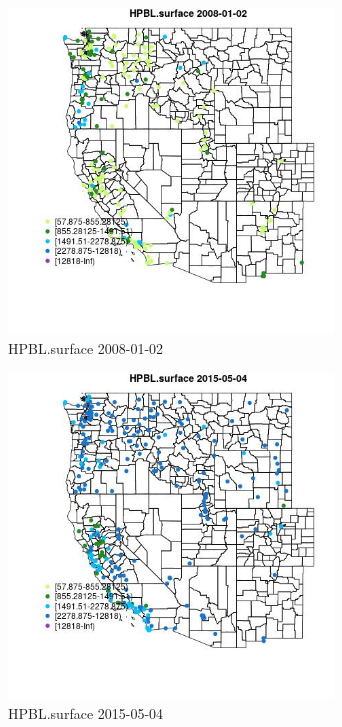 \begin{figure} 
\centering  
\includegraphics[width=0.77\textwidth]{Code_Outputs/Report_ML_input_PM25_Step4_part_e_de_duplicated_aves_compiled_2019-05-18wNAs_MapObsHPBLsurface2008-01-02.jpg} 
\caption{\label{fig:Report_ML_input_PM25_Step4_part_e_de_duplicated_aves_compiled_2019-05-18wNAsMapObsHPBLsurface2008-01-02}HPBL.surface 2008-01-02} 
\end{figure} 
 

\begin{figure} 
\centering  
\includegraphics[width=0.77\textwidth]{Code_Outputs/Report_ML_input_PM25_Step4_part_e_de_duplicated_aves_compiled_2019-05-18wNAs_MapObsHPBLsurface2015-05-04.jpg} 
\caption{\label{fig:Report_ML_input_PM25_Step4_part_e_de_duplicated_aves_compiled_2019-05-18wNAsMapObsHPBLsurface2015-05-04}HPBL.surface 2015-05-04} 
\end{figure} 
 

